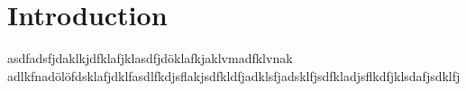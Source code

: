 \section{Introduction}
asdfadsfjdaklkjdfklafjklasdfjdöklafkjaklvmadfklvnak adlkfnadölöfdsklafjdklfasdlfkdjsflakjsdfkldfjadklsfjadsklfjsdfkladjsflkdfjklsdafjsdklfj